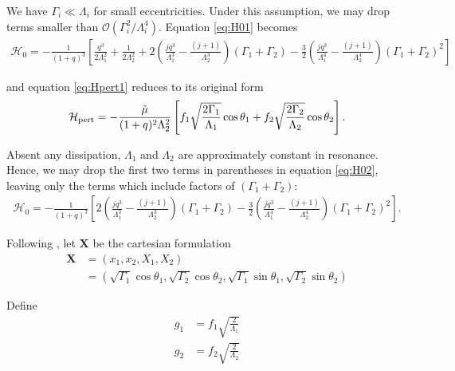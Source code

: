 \documentclass[usenatbib,twocolumn]{mnras}
\renewcommand{\v}[1]{\boldsymbol{ #1 }}
\begin{document}
\noindent We have \(\Gamma_i \ll \Lambda_i\) for small
eccentricities.  Under this assumption, we may drop terms smaller than
\(\mathcal{O}(\Gamma_i^2/\Lambda_i^4)\).  Equation \eqref{eq:H01} becomes
\begin{align}
  \label{eq:H02}
  \mathcal{H}_0
  = -\frac{1}{(1+q)^3}\left[
     \frac{q^3}{2\Lambda_1^2} + \frac{1}{2\Lambda_2^2}
   + 2\left(
     \frac{jq^3}{\Lambda_1^3} - \frac{(j+1)}{\Lambda_2^3}
     \right)(\Gamma_1+\Gamma_2)
   -\frac32\left( 
     \frac{jq^3}{\Lambda_1^4} - \frac{(j+1)}{\Lambda_2^4}\right)
     (\Gamma_1+\Gamma_2)^2
     \right]
\end{align}

\noindent
and equation \eqref{eq:Hpert1} reduces to its original form
\begin{align}
\label{eq:H_3}
  \mathcal{H}_{\rm pert}
  =-\frac{\tilde\mu}{(1+q)^2\Lambda_2^2}
  \left[
  f_1\sqrt{\frac{2\Gamma_1}{\Lambda_1}}\cos\theta_1
  +f_2\sqrt{\frac{2\Gamma_2}{\Lambda_2}}\cos\theta_2
  \right].
\end{align}

\noindent Absent any dissipation, \(\Lambda_1\) and
\(\Lambda_2\) are approximately constant in resonance.  Hence, we may
drop the first two terms in parentheses in equation \eqref{eq:H02},
leaving only the terms which include factors of \((\Gamma_1+\Gamma_2)\):
\begin{align}
  \label{eq:H03}
  \mathcal{H}_0
  = -\frac{1}{(1+q)^3}\left[
   2\left(
     \frac{jq^3}{\Lambda_1^3} - \frac{(j+1)}{\Lambda_2^3}
     \right)(\Gamma_1+\Gamma_2)
   -\frac32\left( 
     \frac{jq^3}{\Lambda_1^4} - \frac{(j+1)}{\Lambda_2^4}\right)
     (\Gamma_1+\Gamma_2)^2
     \right].
\end{align}

Following \citep{henrard86_reduc_trans_apocen_librat}
\citep[or equivalently][]{wisdom_canonical_1986}, let \(\v X\) be the
cartesian formulation
\begin{align}
  \v X &= (x_1, x_2, X_1, X_2)\nonumber\\
  &= (\sqrt{\Gamma_1}\cos\theta_1, \sqrt{\Gamma_2}\cos\theta_2,
    \sqrt{\Gamma_1}\sin\theta_1, \sqrt{\Gamma_2}\sin\theta_2)
\end{align}

\noindent 
Define
\begin{align}
    g_1 &= f_1\sqrt{\frac{2}{\Lambda_1}} \\
    g_2 &= f_2\sqrt{\frac{2}{\Lambda_2}} \\
\end{align}
\end{document}
